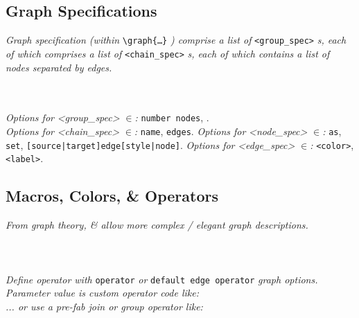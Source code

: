 \subsection*{Graph Specifications}
\textit{Graph specification (within } \texttt{\textbackslash graph\{\dots\}} \textit{) comprise a list of } \texttt{<group\_spec>} \textit{s, each of which comprises a list of} \texttt{<chain\_spec>} \textit{s, each of which contains a list of nodes separated by edges.} \\

\\
\\

\textit{Options for } \textit{<group\_spec>} \textit{ $\in$: } \texttt{number nodes}, \texttt{}.\\
\textit{Options for } \textit{<chain\_spec>} \textit{ $\in$: } \texttt{name}, \texttt{edges}. 
\textit{Options for } \textit{<node\_spec>} \textit{ $\in$: } \texttt{as}, \texttt{set}, \texttt{[source|target]edge[style|node]}. 
\textit{Options for } \textit{<edge\_spec>} \textit{ $\in$: } \texttt{<color>}, \texttt{\textquotedbl <label>\textquotedbl}. \\



\subsection*{Macros, Colors, \& Operators}

\textit{From graph theory,  \&  allow more complex / elegant graph descriptions.}\\
\\
\\
\\

\textit{Define operator with } \texttt{operator} \textit{ or } \texttt{default edge operator} \textit{graph options. Parameter value is custom operator code like: }\\
\textit{... or use a pre-fab join or group operator like: }

